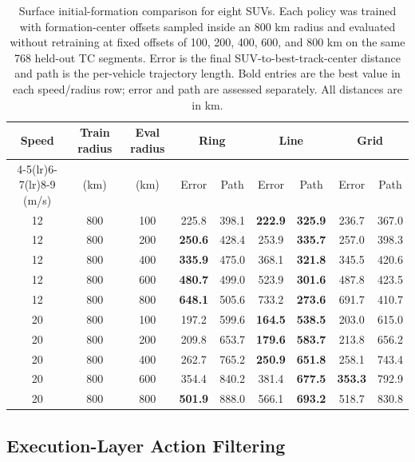 \documentclass[a4paper,fleqn]{cas-dc}
\begin{document}
\begin{table}[t]
\centering
\caption{Surface initial-formation comparison for eight SUVs. Each policy was trained with formation-center offsets sampled inside an 800 km radius and evaluated without retraining at fixed offsets of 100, 200, 400, 600, and 800 km on the same 768 held-out TC segments. Error is the final SUV-to-best-track-center distance and path is the per-vehicle trajectory length. Bold entries are the best value in each speed/radius row; error and path are assessed separately. All distances are in km.}
\label{tab:formation_comparison}
\small
\setlength{\tabcolsep}{2.7pt}
\begin{tabular*}{\textwidth}{@{\extracolsep{\fill}}ccccccccc@{}}
\toprule
Speed & Train radius & Eval radius & \multicolumn{2}{c}{Ring} & \multicolumn{2}{c}{Line} & \multicolumn{2}{c}{Grid} \\
\cmidrule(lr){4-5}\cmidrule(lr){6-7}\cmidrule(lr){8-9}
(m/s) & (km) & (km) & Error & Path & Error & Path & Error & Path \\
\midrule
12 & 800 & 100 & 225.8 & 398.1 & \textbf{222.9} & \textbf{325.9} & 236.7 & 367.0 \\
12 & 800 & 200 & \textbf{250.6} & 428.4 & 253.9 & \textbf{335.7} & 257.0 & 398.3 \\
12 & 800 & 400 & \textbf{335.9} & 475.0 & 368.1 & \textbf{321.8} & 345.5 & 420.6 \\
12 & 800 & 600 & \textbf{480.7} & 499.0 & 523.9 & \textbf{301.6} & 487.8 & 423.5 \\
12 & 800 & 800 & \textbf{648.1} & 505.6 & 733.2 & \textbf{273.6} & 691.7 & 410.7 \\
\midrule
20 & 800 & 100 & 197.2 & 599.6 & \textbf{164.5} & \textbf{538.5} & 203.0 & 615.0 \\
20 & 800 & 200 & 209.8 & 653.7 & \textbf{179.6} & \textbf{583.7} & 213.8 & 656.2 \\
20 & 800 & 400 & 262.7 & 765.2 & \textbf{250.9} & \textbf{651.8} & 258.1 & 743.4 \\
20 & 800 & 600 & 354.4 & 840.2 & 381.4 & \textbf{677.5} & \textbf{353.3} & 792.9 \\
20 & 800 & 800 & \textbf{501.9} & 888.0 & 566.1 & \textbf{693.2} & 518.7 & 830.8 \\
\bottomrule
\end{tabular*}
\end{table}

\subsection{Execution-Layer Action Filtering}
\end{document}
